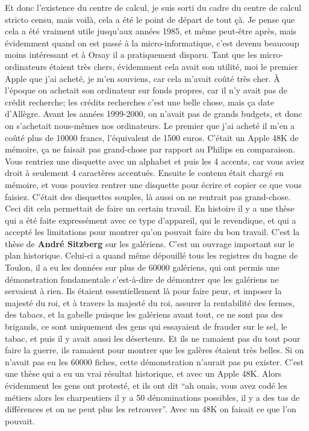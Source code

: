 Et donc l'existence du centre de calcul, je suis sorti du cadre du centre de calcul stricto censu, mais voilà, cela a été le point de départ de tout çà. Je pense que cela a été vraiment utile jusqu'aux années 1985, et même peut-être après, mais évidemment quand on est passé à la micro-informatique, c'est devenu beaucoup moins intéressant et à Orsay il a pratiquement disparu. Tant que les micro-ordinateurs étaient très chers, évidemment cela avait son utilité, moi le premier Apple que j'ai acheté, je m'en souviens, car cela m'avait coûté très cher. À l'époque on achetait son ordinateur sur fonds propres, car il n'y avait pas de crédit recherche; les crédits recherches c'est une belle chose, mais ça date d'Allègre. Avant les années 1999-2000, on n’avait pas de grands budgets, et donc on s'achetait nous-mêmes nos ordinateurs. Le premier que j'ai acheté il m'en a coûté plus de 10000 francs, l'équivalent de 1500 euros. C'était un Apple 48K de mémoire, ça ne faisait pas grand-chose par rapport au Philips en comparaison. Vous rentriez une disquette avec un alphabet et puis les 4 accents, car vous aviez droit à seulement 4 caractères accentués. Ensuite le contenu était chargé en mémoire, et vous pouviez rentrer une disquette pour écrire et copier ce que vous faisiez. C'était des disquettes souples, là aussi on ne rentrait pas grand-chose. Ceci dit cela permettait de faire un certain travail. En histoire il y a une thèse qui a été faite expressément avec ce type d'appareil, qui le revendique, et qui a accepté les limitations pour montrer qu'on pouvait faire du bon travail. C'est la thèse de \textbf{André Sitzberg} sur les galériens. C'est un ouvrage important sur le plan historique. Celui-ci a quand même dépouillé tous les registres du bagne de Toulon, il a eu les données sur plus de 60000 galériens, qui ont permis une démonstration fondamentale c'est-à-dire de démontrer que les galériens ne servaient à rien. Ils étaient essentiellement là pour faire peur, et imposer la majesté du roi, et à travers la majesté du roi, assurer la rentabilité des fermes, des tabacs, et la gabelle puisque les galériens avant tout, ce ne sont pas des brigands, ce sont uniquement des gens qui essayaient de frauder sur le sel, le tabac, et puis il y avait aussi les déserteurs. Et ils ne ramaient pas du tout pour faire la guerre,  ils ramaient pour montrer que les galères étaient très belles. Si on n'avait pas eu les 60000 fiches, cette démonstration n'aurait pas pu exister. C'est une thèse qui a eu un vrai résultat historique, et avec un Apple 48K. Alors évidemment les gens ont protesté, et ils ont dit \enquote{ah ouais, vous avez codé les métiers alors les charpentiers il y a 50 dénominations possibles, il y a des tas de différences et on ne peut plus les retrouver}. Avec un 48K on faisait ce que l'on pouvait.


